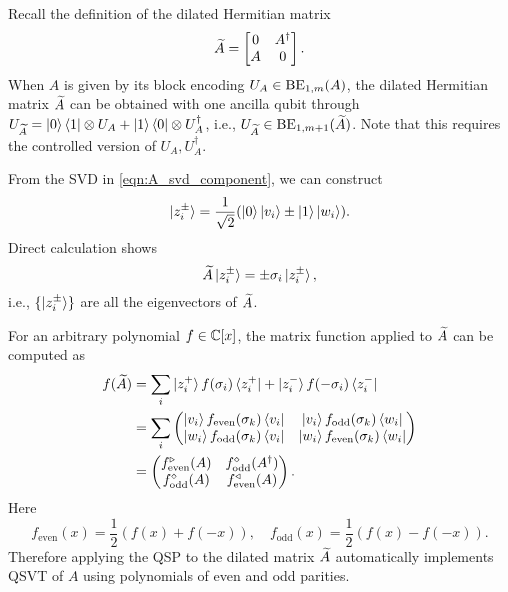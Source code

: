 Recall the definition of the dilated Hermitian matrix 
\begin{equation}
\label{eqn:dilation_trick}
    \widetilde{A}= \begin{bmatrix} 0 & A^\dagger\\ A & 0 \end{bmatrix}.
\end{equation}
When $A$ is given by its block encoding $U_A\in\operatorname{BE}_{1,m}(A)$, the dilated Hermitian matrix $\widetilde{A}$ can be obtained with one ancilla qubit through $U_{\widetilde{A}}=\ket{0}\bra{1}\otimes U_A + \ket{1}\bra{0}\otimes U_A^\dagger$, i.e., $U_{\widetilde{A}}\in\operatorname{BE}_{1,m+1}(\widetilde{A})$. Note that this requires the controlled version of $U_A,U_A^{\dag}$. 

From the SVD in \cref{eqn:A_svd_component}, we can construct 
\begin{equation}
\ket{z^{\pm}_i}=\frac{1}{\sqrt{2}}(\ket{0}\ket{v_i}\pm\ket{1}\ket{w_i}).
\end{equation}
Direct calculation shows
\begin{equation}
\widetilde{A}\ket{z^{\pm}_i}=\pm \sigma_i \ket{z^{\pm}_i},
\end{equation}
i.e., $\{\ket{z^{\pm}_i}\}$ are all the eigenvectors of $\widetilde{A}$.

For an arbitrary polynomial $f\in\mathbb{C}[x]$, the matrix function applied to $\widetilde{A}$ can be computed as
\begin{equation}
\begin{split}
f(\widetilde{A})&= \sum_{i} \ket{z^{+}_i} f(\sigma_i) \bra{z^{+}_i}+
\ket{z^{-}_i} f(-\sigma_i) \bra{z^{-}_i}\\
&=\sum_{i} \begin{pmatrix}
\ket{v_i} f_{\mathrm{even}}(\sigma_k)\bra{v_i} & \ket{v_i} f_{\mathrm{odd}}(\sigma_k)\bra{w_i}\\
\ket{w_i} f_{\mathrm{odd}}(\sigma_k)\bra{v_i} & \ket{w_i} f_{\mathrm{even}}(\sigma_k)\bra{w_i}\\
\end{pmatrix}\\
&=\begin{pmatrix}
f^{\triangleright}_{\mathrm{even}}(A) & f^{\diamond}_{\mathrm{odd}}(A^{\dag})\\
f^{\diamond}_{\mathrm{odd}}(A)& f^{\triangleleft}_{\mathrm{even}}(A)
\end{pmatrix}.
\end{split}
\end{equation}
Here 
\begin{equation}
f_{\mathrm{even}}(x)=\frac12(f(x)+f(-x)), \quad f_{\mathrm{odd}}(x)=\frac12(f(x)-f(-x)).
\end{equation}
Therefore applying the QSP to the dilated matrix $\widetilde{A}$ automatically implements QSVT of $A$ using polynomials of even and odd parities.


